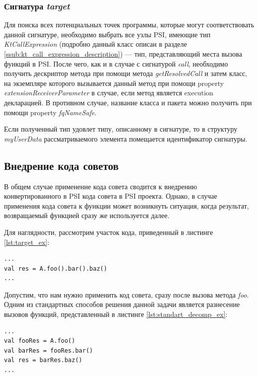 \subsubsection{Сигнатура \textit{target}}
\label{ssub:target_signature}
Для поиска всех потенциальных точек программы, которые могут соответствовать
данной сигнатуре, необходимо выбрать все узлы PSI, имеющие тип
\textit{KtCallExpression} (подробно данный класс описан в разделе
\ref{ssub:kt_call_expression_description}) --- тип, представляющий места вызова
функций в PSI.
После чего, как и в случае с сигнатурой \textit{call}, необходимо получить
дескриптор метода при помощи метода \textit{getResolvedCall} и затем класс, на
экземпляре которого вызывается данный метод при помощи property
\textit{extensionReceiverParameter} в случае, если метод является execution
декларацией.
В противном случае, название класса и пакета можно получить при помощи property
\textit{fqNameSafe}.

Если полученный тип удовлет	типу, описанному в сигнатуре, то в структуру
\textit{myUserData} рассматриваемого элемента помещается идентификатор
сигнатуры.
\subsection{Внедрение кода советов}
\label{sub:advice_applying_description}
В общем случае применение кода совета сводится к внедрению конвертированного в
PSI кода совета в PSI проекта.
Однако, в случае применения кода совета к функции может возникнуть ситуация,
когда результат, возвращаемый функцией сразу же используется далее.

Для наглядности, рассмотрим участок кода, приведенный в листинге
\ref{lst:target_ex}:
\begin{lstlisting}[label=lst:target_ex,
    caption={Пример целевой точки внедрения}]
...
val res = A.foo().bar().baz()
...
\end{lstlisting}
Допустим, что нам нужно применить код совета, сразу после вызова метода
\textit{foo}.
Одним из стандартных способов решения данной задачи является разнесение вызовов
функций, представленный в листинге \ref{lst:standart_decomp_ex}:
\begin{lstlisting}[label=lst:standart_decomp_ex,
    caption={Пример разнесения вызовов методов}]
...
val fooRes = A.foo()
val barRes = fooRes.bar()
val res = barRes.baz()
...
\end{lstlisting}

